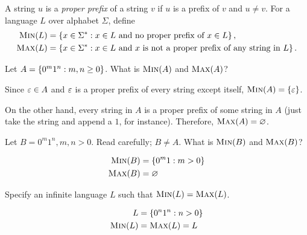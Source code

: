 \begin{problem}
  A string $u$ is a \emph{proper prefix} of a string $v$ if $u$ is a prefix of $v$ and $u \neq v$.
  For a language $L$ over alphabet $\Sigma$, define
  \begin{align*}
    \textsc{Min}(L) &= \left\{x \in \Sigma^* : x \in L \text{ and no proper prefix of } x \in L\right\},\\
    \textsc{Max}(L) &= \left\{x \in \Sigma^* : x \in L \text{ and $x$ is not a proper prefix of any string in $L$}\right\}.
  \end{align*}

  \begin{enumalph}
    \item Let $A = \left\{0^m1^n : m, n \ge 0\right\}$. What is $\textsc{Min}(A)$ and $\textsc{Max}(A)$?
      \begin{Answer}
        Since $\varepsilon \in A$ and $\varepsilon$ is a proper prefix of every string except itself,
        $\textsc{Min}(A) = \left\{\varepsilon\right\}$.

        \step
        On the other hand, every string in $A$ is a proper prefix
        of some string in $A$ (just take the string and append a $1$, for instance).
        Therefore, $\textsc{Max}(A) = \varnothing$.
        
      \end{Answer}
    \item Let $B = 0^m1^n, m, n > 0$. Read carefully; $B \neq A$. What is $\textsc{Min}(B)$ and $\textsc{Max}(B)$?
      \begin{Answer}
        \begin{align*}
          \textsc{Min}(B) &= \left\{0^m1 : m > 0\right\} \\
          \textsc{Max}(B) &= \varnothing
        \end{align*}
      \end{Answer}

    \item Specify an infinite language $L$ such that $\textsc{Min}(L) = \textsc{Max}(L)$.
      \begin{Answer}
        \begin{align*}
          L &= \left\{0^n1^n : n > 0 \right\}\\
          \textsc{Min}(L) &= \textsc{Max}(L) = L
        \end{align*}
      \end{Answer}
  \end{enumalph}
\end{problem}

